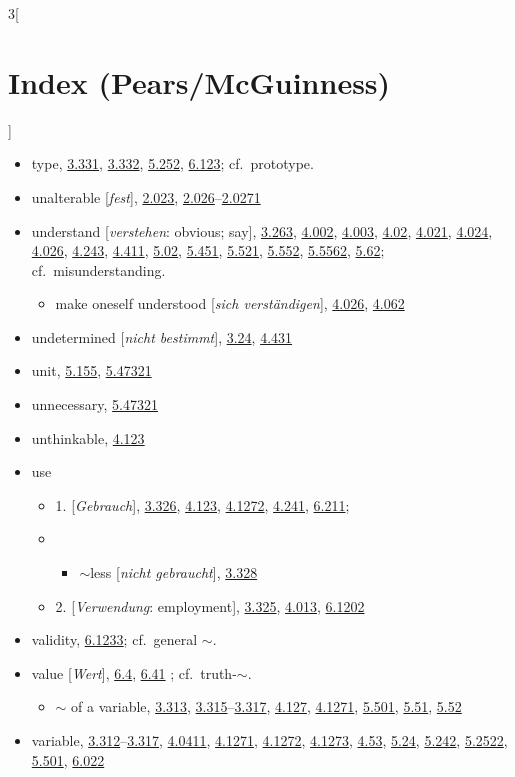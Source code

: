 \documentclass[oneside,openany,12pt]{book}
\newcommand{\indexentry}[1]{\item #1}
\newcommand{\indexsubentry}[1]{\begin{itemize} \item #1 \end{itemize}}
\newcommand{\indexsubsubentry}[1]{\begin{itemize} \item \begin{itemize} \item #1 \end{itemize} \end{itemize}}
\newcommand{\indexref}[1]{\hyperlink{prop#1}{#1}}
\newcommand{\indexgap}{\bigskip}
\begin{document}
\begin{multicols}{3}[\section*{Index (Pears/McGuinness)}]
\begin{itemize}
   \indexsubentry{$\sim$th-possibility, \indexref{4.3}--\indexref{4.44}, \indexref{4.442}, \indexref{4.45}, \indexref{4.46}, \indexref{5.101}}

   \indexsubentry{$\sim$th-value, \indexref{4.063}}

\indexentry{type, \indexref{3.331}, \indexref{3.332}, \indexref{5.252}, \indexref{6.123}; cf.\ prototype.}

\indexgap

\indexentry{unalterable [\textit{fest}], \indexref{2.023}, \indexref{2.026}--\indexref{2.0271}}

\indexentry{understand [\textit{verstehen}: obvious; say], \indexref{3.263}, \indexref{4.002}, \indexref{4.003}, \indexref{4.02}, \indexref{4.021}, \indexref{4.024}, \indexref{4.026}, \indexref{4.243}, \indexref{4.411}, \indexref{5.02}, \indexref{5.451}, \indexref{5.521}, \indexref{5.552}, \indexref{5.5562}, \indexref{5.62}; cf.\ misunderstanding.}

   \indexsubentry{make oneself understood [\textit{sich verst{\"a}ndigen}], \indexref{4.026}, \indexref{4.062}}

\indexentry{undetermined [\textit{nicht bestimmt}], \indexref{3.24}, \indexref{4.431}}

\indexentry{unit, \indexref{5.155}, \indexref{5.47321}}

\indexentry{unnecessary, \indexref{5.47321}}

\indexentry{unthinkable, \indexref{4.123}}

\indexentry{use}

   \indexsubentry{1. [\textit{Gebrauch}], \indexref{3.326}, \indexref{4.123}, \indexref{4.1272}, \indexref{4.241}, \indexref{6.211};}

   \indexsubsubentry{$\sim$less [\textit{nicht gebraucht}], \indexref{3.328}}

   \indexsubentry{2. [\textit{Verwendung}: employment], \indexref{3.325}, \indexref{4.013}, \indexref{6.1202}}

\indexgap

\indexentry{validity, \indexref{6.1233}; cf.\ general $\sim$.}

\indexentry{value [\textit{Wert}], \indexref{6.4}, \indexref{6.41} ; cf.\ truth-$\sim$.}

   \indexsubentry{$\sim$ of a variable, \indexref{3.313}, \indexref{3.315}--\indexref{3.317}, \indexref{4.127}, \indexref{4.1271}, \indexref{5.501}, \indexref{5.51}, \indexref{5.52}}

\indexentry{variable, \indexref{3.312}--\indexref{3.317}, \indexref{4.0411}, \indexref{4.1271}, \indexref{4.1272}, \indexref{4.1273}, \indexref{4.53}, \indexref{5.24}, \indexref{5.242}, \indexref{5.2522}, \indexref{5.501}, \indexref{6.022}}


\end{itemize}
\end{multicols}
\end{document}
